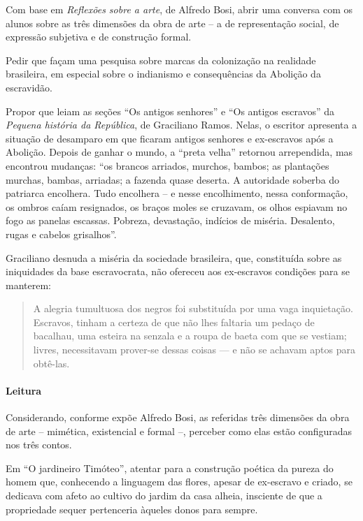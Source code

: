 \documentclass[11pt]{extarticle}
\begin{document}
Com base em \emph{Reflexões sobre a arte}, de Alfredo Bosi, abrir uma
conversa com os alunos sobre as três dimensões da obra de arte -- a de
representação social, de expressão subjetiva e de construção formal.

Pedir que façam uma pesquisa sobre marcas da colonização na realidade
brasileira, em especial sobre o indianismo e consequências da Abolição
da escravidão.

Propor que leiam as seções ``Os antigos senhores'' e ``Os antigos
escravos'' da \emph{Pequena história da República}, de Graciliano Ramos.
Nelas, o escritor apresenta a situação de desamparo em que ficaram
antigos senhores e ex-escravos após a Abolição. Depois de ganhar o
mundo, a ``preta velha'' retornou arrependida, mas encontrou mudanças:
``os brancos arriados, murchos, bambos; as plantações murchas, bambas,
arriadas; a fazenda quase deserta. A autoridade soberba do patriarca
encolhera. Tudo encolhera -- e nesse encolhimento, nessa conformação, os
ombros caíam resignados, os braços moles se cruzavam, os olhos espiavam
no fogo as panelas escassas. Pobreza, devastação, indícios de miséria.
Desalento, rugas e cabelos grisalhos''.

Graciliano desnuda a miséria da sociedade brasileira, que, constituída
sobre as iniquidades da base escravocrata, não ofereceu aos ex-escravos
condições para se manterem:

\begin{quote}
A alegria tumultuosa dos negros foi substituída por uma vaga
inquietação. Escravos, tinham a certeza de que não lhes faltaria um
pedaço de bacalhau, uma esteira na senzala e a roupa de baeta com que se
vestiam; livres, necessitavam prover-se dessas coisas --- e não se
achavam aptos para obtê-las.
\end{quote}

\asterisc\paragraph{Leitura}

Considerando, conforme expõe Alfredo Bosi, as referidas três dimensões
da obra de arte -- mimética, existencial e formal --, perceber como elas
estão configuradas nos três contos.

Em ``O jardineiro Timóteo'', atentar para a construção poética da pureza
do homem que, conhecendo a linguagem das flores, apesar de ex-escravo e
criado, se dedicava com afeto ao cultivo do jardim da casa alheia,
insciente de que a propriedade sequer pertenceria àqueles donos para
sempre.
\end{document}
